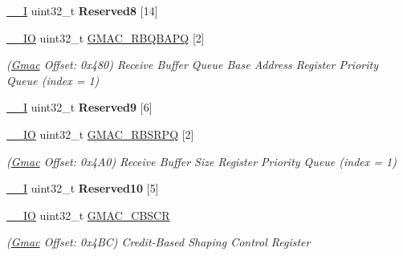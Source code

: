 \begin{DoxyCompactItemize}
\mbox{\hyperlink{core__cm7_8h_af63697ed9952cc71e1225efe205f6cd3}{\+\_\+\+\_\+I}} uint32\+\_\+t {\bfseries Reserved8} \mbox{[}14\mbox{]}
\item 
\mbox{\label{structGmac_afb729f220cd1e060ccbe24e2de4be6a7}} 
\mbox{\hyperlink{core__cm7_8h_aec43007d9998a0a0e01faede4133d6be}{\+\_\+\+\_\+\+IO}} uint32\+\_\+t \mbox{\hyperlink{structGmac_afb729f220cd1e060ccbe24e2de4be6a7}{G\+M\+A\+C\+\_\+\+R\+B\+Q\+B\+A\+PQ}} \mbox{[}2\mbox{]}
\begin{DoxyCompactList}\small\item\em (\mbox{\hyperlink{structGmac}{Gmac}} Offset\+: 0x480) Receive Buffer Queue Base Address Register Priority Queue (index = 1) \end{DoxyCompactList}\item 
\mbox{\label{structGmac_a80bd76a3826978f4e7ff8a8d2ece4447}} 
\mbox{\hyperlink{core__cm7_8h_af63697ed9952cc71e1225efe205f6cd3}{\+\_\+\+\_\+I}} uint32\+\_\+t {\bfseries Reserved9} \mbox{[}6\mbox{]}
\item 
\mbox{\label{structGmac_a4e2034273f89fc80a14cbeeb28287da6}} 
\mbox{\hyperlink{core__cm7_8h_aec43007d9998a0a0e01faede4133d6be}{\+\_\+\+\_\+\+IO}} uint32\+\_\+t \mbox{\hyperlink{structGmac_a4e2034273f89fc80a14cbeeb28287da6}{G\+M\+A\+C\+\_\+\+R\+B\+S\+R\+PQ}} \mbox{[}2\mbox{]}
\begin{DoxyCompactList}\small\item\em (\mbox{\hyperlink{structGmac}{Gmac}} Offset\+: 0x4\+A0) Receive Buffer Size Register Priority Queue (index = 1) \end{DoxyCompactList}\item 
\mbox{\label{structGmac_a9ba7e76c59906575b46c1cad2feeb3b2}} 
\mbox{\hyperlink{core__cm7_8h_af63697ed9952cc71e1225efe205f6cd3}{\+\_\+\+\_\+I}} uint32\+\_\+t {\bfseries Reserved10} \mbox{[}5\mbox{]}
\item 
\mbox{\label{structGmac_ac382133578fa8834ce482ec50014b6f0}} 
\mbox{\hyperlink{core__cm7_8h_aec43007d9998a0a0e01faede4133d6be}{\+\_\+\+\_\+\+IO}} uint32\+\_\+t \mbox{\hyperlink{structGmac_ac382133578fa8834ce482ec50014b6f0}{G\+M\+A\+C\+\_\+\+C\+B\+S\+CR}}
\begin{DoxyCompactList}\small\item\em (\mbox{\hyperlink{structGmac}{Gmac}} Offset\+: 0x4\+BC) Credit-\/\+Based Shaping Control Register \end{DoxyCompactList}\item 

\end{DoxyCompactItemize}
